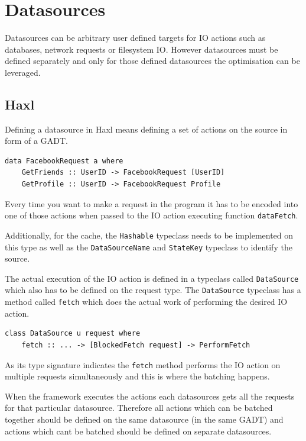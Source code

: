 \section{Datasources}

Datasources can be arbitrary user defined targets for IO actions such as databases, network requests or filesystem IO.
However datasources must be defined separately and only for those defined datasources the optimisation can be leveraged.

\subsection{Haxl}

Defining a datasource in Haxl means defining a set of actions on the source in form of a GADT.

\begin{verbatim}
data FacebookRequest a where
    GetFriends :: UserID -> FacebookRequest [UserID]
    GetProfile :: UserID -> FacebookRequest Profile
\end{verbatim}

Every time you want to make a request in the program it has to be encoded into one of those actions when passed to the IO action executing function \texttt{dataFetch}.

Additionally, for the cache, the \texttt{Hashable} typeclass needs to be implemented on this type as well as the \texttt{DataSourceName} and \texttt{StateKey} typeclass to identify the source.

The actual execution of the IO action is defined in a typeclass called \texttt{DataSource} which also has to be defined on the request type.
The \texttt{DataSource} typeclass has a method called \texttt{fetch} which does the actual work of performing the desired IO action.

\begin{verbatim}
class DataSource u request where
    fetch :: ... -> [BlockedFetch request] -> PerformFetch
\end{verbatim}

As its type signature indicates the \texttt{fetch} method performs the IO action on multiple requests simultaneously and this is where the batching happens.

When the framework executes the actions each datasources gets all the requests for that particular datasource. Therefore all actions which can be batched together should be defined on the same datasource (in the same GADT) and actions which cant be batched should be defined on separate datasources.

